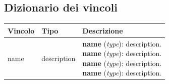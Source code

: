 \subsection{Dizionario dei vincoli}

\begin{longtable}{p{2.5cm}|p{4cm}|p{7.2cm}}
    
    \rowcolor{black!10}
    \textbf{Vincolo} & \textbf{Tipo} & \textbf{Descrizione} \\ \hline
    \endhead

    name & description &
    \parbox{7.2cm}{
        \textbf{name} (\textit{type}): description. \\
        \textbf{name} (\textit{type}): description. \\
        \textbf{name} (\textit{type}): description. \\
        \textbf{name} (\textit{type}): description.
    } \\ \hline

\end{longtable}